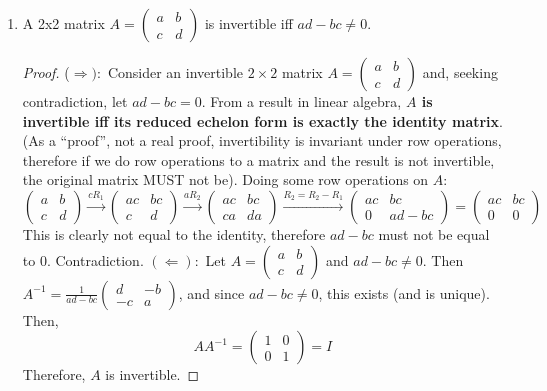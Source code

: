 \documentclass[a4paper,12pt]{extarticle}
\theoremstyle{definition}
\begin{document}
\begin{enumerate}[label=(\alph*)]
        \item A 2x2 matrix $A=\begin{pmatrix}a & b \\c & d\end{pmatrix}$ is invertible iff $ad-bc\neq0$.\begin{proof}($\Longrightarrow):$ Consider an invertible $2\times 2$ matrix $A=\begin{pmatrix}a & b \\c & d\end{pmatrix}$ and, seeking contradiction, let $ad-bc=0$. From a result in linear algebra, \textbf{$A$ is invertible iff its reduced echelon form is exactly the identity matrix}.(As a ``proof'', not a real proof, invertibility is invariant under row operations, therefore if we do row operations to a matrix and the result is not invertible, the original matrix MUST not be). Doing some row operations on $A$:$$\begin{pmatrix}a & b \\c & d\end{pmatrix}\xrightarrow{cR_1}\begin{pmatrix}ac & bc \\c & d\end{pmatrix}\xrightarrow{aR_2}\begin{pmatrix}ac & bc \\ca & da\end{pmatrix}\xrightarrow{R_2=R_2-R_1}\begin{pmatrix}ac & bc \\0 & ad-bc\end{pmatrix}=\begin{pmatrix}ac & bc \\0 & 0\end{pmatrix}$$ This is clearly not equal to the identity, therefore $ad-bc$ must not be equal to 0. Contradiction.
        \myskip 
        $(\Longleftarrow):$ Let $A=\begin{pmatrix}a & b \\c & d\end{pmatrix}$ and $ad-bc\neq0$. Then $A^{-1}=\frac{1}{ad-bc}\begin{pmatrix}d & -b \\-c & a\end{pmatrix}$, and since $ad-bc\neq0$, this exists (and is unique). Then, $$AA^{-1}=\begin{pmatrix}1 & 0 \\0 & 1\end{pmatrix}=I$$ Therefore, $A$ is invertible.

\end{proof}
\end{enumerate}
\end{document}
